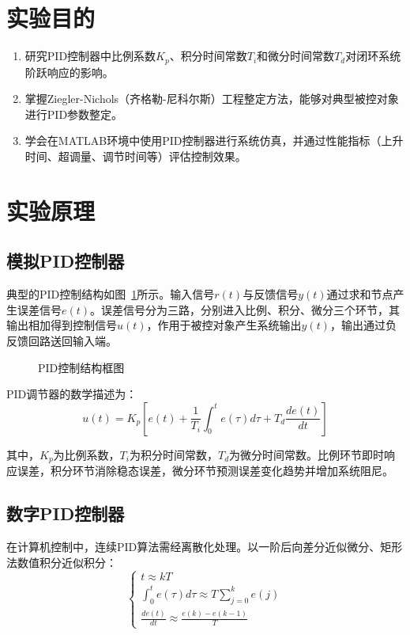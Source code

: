 \documentclass{../common/SCNU_Experimental_Report}
\begin{document}
\maketitle

\section{实验目的}
\begin{enumerate}
    \item 研究PID控制器中比例系数\(K_p\)、积分时间常数\(T_i\)和微分时间常数\(T_d\)对闭环系统阶跃响应的影响。
    \item 掌握Ziegler-Nichols（齐格勒-尼科尔斯）工程整定方法，能够对典型被控对象进行PID参数整定。
    \item 学会在MATLAB环境中使用PID控制器进行系统仿真，并通过性能指标（上升时间、超调量、调节时间等）评估控制效果。
\end{enumerate}

\section{实验原理}
\subsection{模拟PID控制器}

典型的PID控制结构如图~\ref{fig:pid_struct}所示。输入信号\(r(t)\)与反馈信号\(y(t)\)通过求和节点产生误差信号\(e(t)\)。误差信号分为三路，分别进入比例、积分、微分三个环节，其输出相加得到控制信号\(u(t)\)，作用于被控对象产生系统输出\(y(t)\)，输出通过负反馈回路送回输入端。

\begin{figure}[H]
    \centering
    \caption{PID控制结构框图}
    \label{fig:pid_struct}
\end{figure}

PID调节器的数学描述为：
\[
u(t) = K_p \left[ e(t) + \frac{1}{T_i}\int_0^t e(\tau)d\tau + T_d\frac{de(t)}{dt} \right]
\]

其中，\(K_p\)为比例系数，\(T_i\)为积分时间常数，\(T_d\)为微分时间常数。比例环节即时响应误差，积分环节消除稳态误差，微分环节预测误差变化趋势并增加系统阻尼。

\subsection{数字PID控制器}

在计算机控制中，连续PID算法需经离散化处理。以一阶后向差分近似微分、矩形法数值积分近似积分：
\[
\begin{cases}
t \approx kT \\
\displaystyle\int_0^t e(\tau)d\tau \approx T\sum_{j=0}^{k} e(j) \\
\displaystyle\frac{de(t)}{dt} \approx \frac{e(k) - e(k-1)}{T}
\end{cases}
\]
\end{document}
